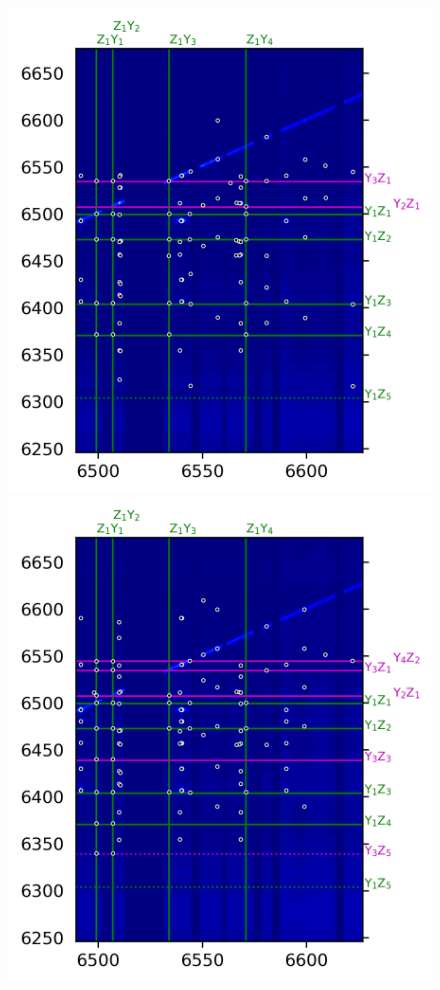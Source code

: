 \documentclass[12pt]{report}
\begin{document}
\begin{figure}[b]
{    \includegraphics[scale=0.97]{JinD_site1_32K}\\
    \includegraphics[scale=0.97]{JinD_site1_60K}\hfill
}
\end{figure}
\end{document}
